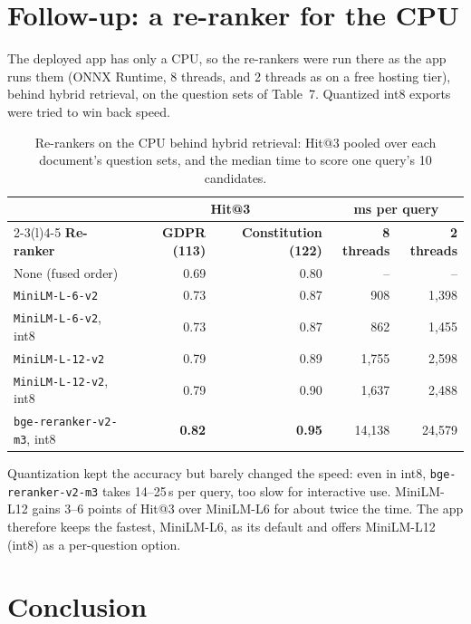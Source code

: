\documentclass[10pt,a4paper]{article}
\begin{document}
\section{Follow-up: a re-ranker for the CPU}

The deployed app has only a CPU, so the re-rankers were run there as the app runs them (ONNX Runtime, 8 threads,
and 2 threads as on a free hosting tier), behind hybrid retrieval, on the question sets of Table~7. Quantized int8
exports were tried to win back speed.

\begin{table}[!htbp]
\centering\small
\begin{tabular}{@{}lrrrr@{}}
\toprule
 & \multicolumn{2}{c}{\textbf{Hit@3}} & \multicolumn{2}{c}{\textbf{ms per query}} \\
\cmidrule(lr){2-3}\cmidrule(l){4-5}
\textbf{Re-ranker} & \textbf{GDPR (113)} & \textbf{Constitution (122)} & \textbf{8 threads} & \textbf{2 threads} \\
\midrule
None (fused order)                 & 0.69 & 0.80 & -- & -- \\
\texttt{MiniLM-L-6-v2}             & 0.73 & 0.87 & 908 & 1{,}398 \\
\texttt{MiniLM-L-6-v2}, int8       & 0.73 & 0.87 & 862 & 1{,}455 \\
\texttt{MiniLM-L-12-v2}            & 0.79 & 0.89 & 1{,}755 & 2{,}598 \\
\texttt{MiniLM-L-12-v2}, int8      & 0.79 & 0.90 & 1{,}637 & 2{,}488 \\
\texttt{bge-reranker-v2-m3}, int8  & \textbf{0.82} & \textbf{0.95} & 14{,}138 & 24{,}579 \\
\bottomrule
\end{tabular}
\caption{Re-rankers on the CPU behind hybrid retrieval: Hit@3 pooled over each document's question sets, and the
median time to score one query's 10 candidates.}
\end{table}

Quantization kept the accuracy but barely changed the speed: even in int8, \texttt{bge-reranker-v2-m3} takes
14--25\,s per query, too slow for interactive use. MiniLM-L12 gains 3--6 points of Hit@3 over MiniLM-L6 for about twice the time. The app therefore
keeps the fastest, MiniLM-L6, as its default and offers MiniLM-L12 (int8) as a per-question option.

\section*{Conclusion}
\end{document}
